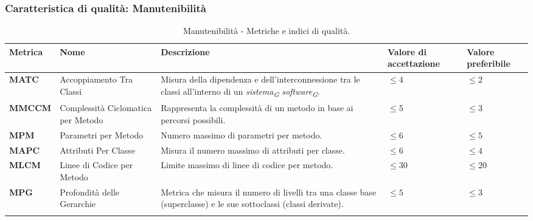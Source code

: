 \subsubsection{Caratteristica di qualità: Manutenibilità}
\hspace{1pt}
    \begin{longtable}{|C{1.8cm}|L{3cm}|L{4cm}|L{2.5cm}|L{2.5cm}|}
                \hline
                \textbf{Metrica} & \textbf{Nome} & \textbf{Descrizione} & \textbf{Valore di accettazione} & \textbf{Valore preferibile}\\
                \hline
                \textbf{MATC} & Accoppiamento Tra Classi & Misura della dipendenza e dell'interconnessione tra le classi all'interno di un \textit{sistema}\textsubscript{\textit{G}} \textit{software}\textsubscript{\textit{G}}.   & $\leq 4$  & $\leq 2$ \\
                \hline
                \textbf{MMCCM} & Complessità Ciclomatica per Metodo & Rappresenta la complessità di un metodo in base ai percorsi possibili. & $\leq 5$ & $\leq 3$ \\
                \hline
                \textbf{MPM} & Parametri per Metodo & Numero massimo di parametri per metodo. & $\leq 6$ & $\leq 5$ \\
                \hline
                \textbf{MAPC} & Attributi Per Classe & Misura il numero massimo di attributi per classe. & $\leq 6$ & $\leq 4$ \\
                \hline
                 \textbf{MLCM} & Linee di Codice per Metodo & Limite massimo di linee di codice per metodo. & $\leq 30$ & $\leq 20$ \\
                \hline
                \textbf{MPG} & Profondità delle Gerarchie & Metrica che misura il numero di livelli tra una classe base (superclasse) e le sue sottoclassi (classi derivate). & $\leq 5$  & $\leq 3$ \\
                \hline
                \caption{Manutenibilità - Metriche e indici di qualità.}
        \label{tab:metriche_manutenibilità_testo}
    \end{longtable}


